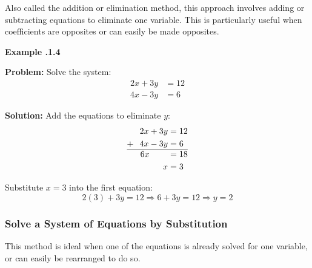 Also called the addition or elimination method, this approach involves adding or subtracting equations to eliminate one variable.  This is particularly useful when coefficients are opposites or can easily be made opposites.

\begin{mdframed}[backgroundcolor=blue!10!white]
	\begin{center}
		
		
		\textbf{Example \thesection.1.4}	
	\end{center}
	
	\textbf{Problem:}
	Solve the system:
	\[
	\begin{aligned}
		2x + 3y &= 12 \\
		4x - 3y &= 6
	\end{aligned}
	\]


\textbf{Solution:} Add the equations to eliminate \( y \):
	\[
\begin{aligned}
	2x + 3y &= 12 \\
	+  \hspace{0.1in} 4x - 3y &= 6\\
	\hline
	6x \hspace{0.3in} &= 18 \\
	x&=3
\end{aligned}
\]

Substitute \( x = 3 \) into the first equation:
\[
2(3) + 3y = 12 \Rightarrow 6 + 3y = 12 \Rightarrow y = 2
\]


\end{mdframed}

\newpage
\subsubsection{Solve a System of Equations by Substitution}

This method is ideal when one of the equations is already solved for one variable, or can easily be rearranged to do so. 

